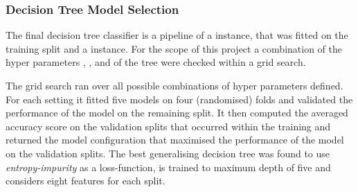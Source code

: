 \subsubsection{Decision Tree Model Selection}


The final decision tree classifier is a pipeline of a  instance, that was fitted on the training split and a  instance. For the scope of this project a combination of the hyper parameters , ,  and  of the tree were checked within a grid search.
\newline

The grid search ran over all possible combinations of hyper parameters defined. For each setting it fitted five models on four (randomised) folds and validated the performance of the model on the remaining split. It then computed the averaged accuracy score on the validation splits that occurred within the training and returned the model configuration that maximised the performance of the model on the validation splits. The best generalising decision tree was found to use \textit{entropy-impurity} as a loss-function, is trained to maximum depth of five and considers eight features for each split. 

